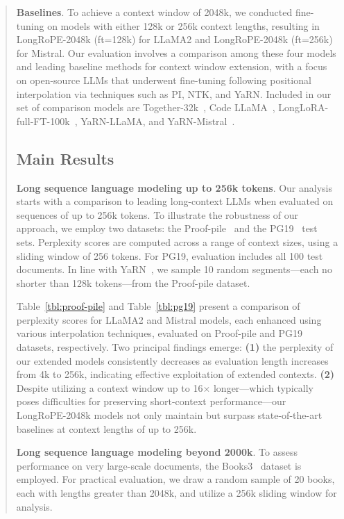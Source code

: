 \begin{abstract}
\textbf{Baselines}. To achieve a context window of 2048k, we conducted fine-tuning on models with either 128k or 256k context lengths, resulting in LongRoPE-2048k (ft=128k) for LLaMA2 and LongRoPE-2048k (ft=256k) for Mistral. Our evaluation involves a comparison among these four models and leading baseline methods for context window extension, with a focus on open-source LLMs that underwent fine-tuning following positional interpolation via techniques such as PI, NTK, and YaRN. Included in our set of comparison models are Together-32k~\cite{together}, Code LLaMA~\cite{codellama}, LongLoRA-full-FT-100k~\cite{longlora}, YaRN-LLaMA, and YaRN-Mistral~\cite{yarn}.

\subsection{Main Results}

\label{sec:mainresult}
\textbf{Long sequence language modeling up to 256k tokens}. Our analysis starts with a comparison to leading long-context LLMs when evaluated on sequences of up to 256k tokens. To illustrate the robustness of our approach, we employ two datasets: the Proof-pile~\cite{pg19} and the PG19~\cite{pile} test sets. Perplexity scores are computed across a range of context sizes, using a sliding window of 256 tokens. For PG19, evaluation includes all 100 test documents. In line with YaRN~\cite{yarn}, we sample 10 random segments—each no shorter than 128k tokens—from the Proof-pile dataset.

Table~\ref{tbl:proof-pile} and Table~\ref{tbl:pg19} present a comparison of perplexity scores for LLaMA2 and Mistral models, each enhanced using various interpolation techniques, evaluated on Proof-pile and PG19 datasets, respectively. Two principal findings emerge: \textbf{(1)} the perplexity of our extended models consistently decreases as evaluation length increases from 4k to 256k, indicating effective exploitation of extended contexts. \textbf{(2)} Despite utilizing a context window up to 16$\times$ longer—which typically poses difficulties for preserving short-context performance—our LongRoPE-2048k models not only maintain but surpass state-of-the-art baselines at context lengths of up to 256k.

\textbf{Long sequence language modeling beyond 2000k}. To assess performance on very large-scale documents, the Books3~\cite{pile} dataset is employed. For practical evaluation, we draw a random sample of 20 books, each with lengths greater than 2048k, and utilize a 256k sliding window for analysis.


\end{abstract}
